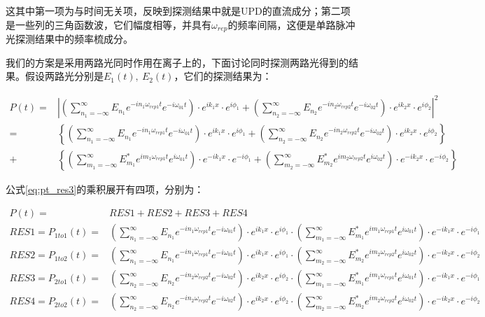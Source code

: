 这其中第一项为与时间无关项，反映到探测结果中就是UPD的直流成分；第二项是一些列的三角函数波，它们幅度相等，并具有$\omega_{rep}$的频率间隔，这便是单路脉冲光探测结果中的频率梳成分。

我们的方案是采用两路光同时作用在离子上的，下面讨论同时探测两路光得到的结果。假设两路光分别是$E_1(t),\ E_2(t)$，它们的探测结果为：
\begin{footnotesize}
\begin{align}
    P(t)=&\left|\left(\sum_{n_1=-\infty}^{\infty}E_{n_1}e^{-in_1\omega_{rep1}t}e^{-i\omega_{01}t}\right)\cdot e^{ik_1x}\cdot e^{i\phi_1} + \left(\sum_{n_2=-\infty}^{\infty}E_{n_2}e^{-in_2\omega_{rep2}t}e^{-i\omega_{02}t}\right)\cdot e^{ik_2x}\cdot e^{i\phi_2}\right|^2\\
    =&\left\{\left(\sum_{n_1=-\infty}^{\infty}E_{n_1}e^{-in_1\omega_{rep1}t}e^{-i\omega_{01}t}\right)\cdot e^{ik_1x}\cdot e^{i\phi_1} + \left(\sum_{n_2=-\infty}^{\infty}E_{n_2}e^{-in_2\omega_{rep2}t}e^{-i\omega_{02}t}\right)\cdot e^{ik_2x}\cdot e^{i\phi_2}\right\}\\
    +&\left\{\left(\sum_{m_1=-\infty}^{\infty}E_{m_1}^* e^{im_1\omega_{rep1}t}e^{i\omega_{01}t}\right)\cdot e^{-ik_1x}\cdot e^{-i\phi_1} + \left(\sum_{m_2=-\infty}^{\infty}E_{m_2}^*e^{im_2\omega_{rep2}t}e^{i\omega_{02}t}\right)\cdot e^{-ik_2x}\cdot e^{-i\phi_2}\right\}\label{eq:pt_res3}
\end{align}
\end{footnotesize}


公式\eqref{eq:pt_res3}的乘积展开有四项，分别为：
\begin{footnotesize}
\begin{align}
    P(t)=&RES1+RES2+RES3+RES4\\
    RES1=P_{1to1}(t)=&\left(\sum_{n_1=-\infty}^{\infty}E_{n_1}e^{-in_1\omega_{rep1}t}e^{-i\omega_{01}t}\right)\cdot e^{ik_1x}\cdot e^{i\phi_1} 
    \cdot \left(\sum_{m_1=-\infty}^{\infty}E_{m_1}^* e^{im_1\omega_{rep1}t}e^{i\omega_{01}t}\right)\cdot e^{-ik_1x}\cdot e^{-i\phi_1}\\
    RES2=P_{1to2}(t)=&\left(\sum_{n_1=-\infty}^{\infty}E_{n_1}e^{-in_1\omega_{rep1}t}e^{-i\omega_{01}t}\right)\cdot e^{ik_1x}\cdot e^{i\phi_1} 
    \cdot \left(\sum_{m_2=-\infty}^{\infty}E_{m_2}^*e^{im_2\omega_{rep2}t}e^{i\omega_{02}t}\right)\cdot e^{-ik_2x}\cdot e^{-i\phi_2}\\
    RES3=P_{2to1}(t)=&\left(\sum_{n_2=-\infty}^{\infty}E_{n_2}e^{-in_2\omega_{rep2}t}e^{-i\omega_{02}t}\right)\cdot e^{ik_2x}\cdot e^{i\phi_2}
    \cdot \left(\sum_{m_1=-\infty}^{\infty}E_{m_1}^* e^{im_1\omega_{rep1}t}e^{i\omega_{01}t}\right)\cdot e^{-ik_1x}\cdot e^{-i\phi_1}\\
    RES4=P_{2to2}(t)=&\left(\sum_{n_2=-\infty}^{\infty}E_{n_2}e^{-in_2\omega_{rep2}t}e^{-i\omega_{02}t}\right)\cdot e^{ik_2x}\cdot e^{i\phi_2}
    \cdot \left(\sum_{m_2=-\infty}^{\infty}E_{m_2}^*e^{im_2\omega_{rep2}t}e^{i\omega_{02}t}\right)\cdot e^{-ik_2x}\cdot e^{-i\phi_2}
\end{align}
\end{footnotesize}

